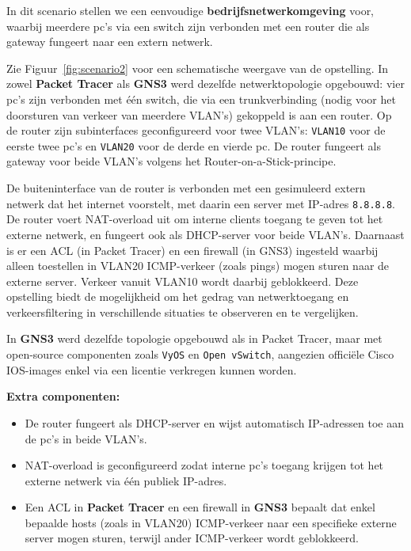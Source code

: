 In dit scenario stellen we een eenvoudige \textbf{bedrijfsnetwerkomgeving} voor, waarbij meerdere pc’s via een switch zijn verbonden met een router die als gateway fungeert naar een extern netwerk.

\vspace{0.3cm}

Zie Figuur~\ref{fig:scenario2} voor een schematische weergave van de opstelling. In zowel \textbf{Packet Tracer} als \textbf{GNS3} werd dezelfde netwerktopologie opgebouwd: vier pc’s zijn verbonden met één switch, die via een trunkverbinding (nodig voor het doorsturen van verkeer van meerdere VLAN’s) gekoppeld is aan een router. Op de router zijn subinterfaces geconfigureerd voor twee VLAN’s: \texttt{VLAN10} voor de eerste twee pc’s en \texttt{VLAN20} voor de derde en vierde pc. De router fungeert als gateway voor beide VLAN’s volgens het Router-on-a-Stick-principe.



\vspace{0.3cm}

De buiteninterface van de router is verbonden met een gesimuleerd extern netwerk dat het internet voorstelt, met daarin een server met IP-adres \texttt{8.8.8.8}. De router voert NAT-overload uit om interne clients toegang te geven tot het externe netwerk, en fungeert ook als DHCP-server voor beide VLAN’s. Daarnaast is er een ACL (in Packet Tracer) en een firewall (in GNS3) ingesteld waarbij alleen toestellen in VLAN20 ICMP-verkeer (zoals pings) mogen sturen naar de externe server. Verkeer vanuit VLAN10 wordt daarbij geblokkeerd. Deze opstelling biedt de mogelijkheid om het gedrag van netwerktoegang en verkeersfiltering in verschillende situaties  te observeren en te vergelijken. 


In \textbf{GNS3} werd dezelfde topologie opgebouwd als in Packet Tracer, maar met open-source componenten zoals \texttt{VyOS} en \texttt{Open vSwitch}, aangezien officiële Cisco IOS-images enkel via een licentie verkregen kunnen worden.


\textbf{Extra componenten:}
\begin{itemize}
    \item De router fungeert als DHCP-server en wijst automatisch IP-adressen toe aan de pc’s in beide VLAN’s.
    \item NAT-overload is geconfigureerd zodat interne pc’s toegang krijgen tot het externe netwerk via één publiek IP-adres.
    \item Een ACL in \textbf{Packet Tracer} en een firewall in \textbf{GNS3} bepaalt dat enkel bepaalde hosts (zoals in VLAN20) ICMP-verkeer naar een specifieke externe server mogen sturen, terwijl ander ICMP-verkeer wordt geblokkeerd.
\end{itemize}

